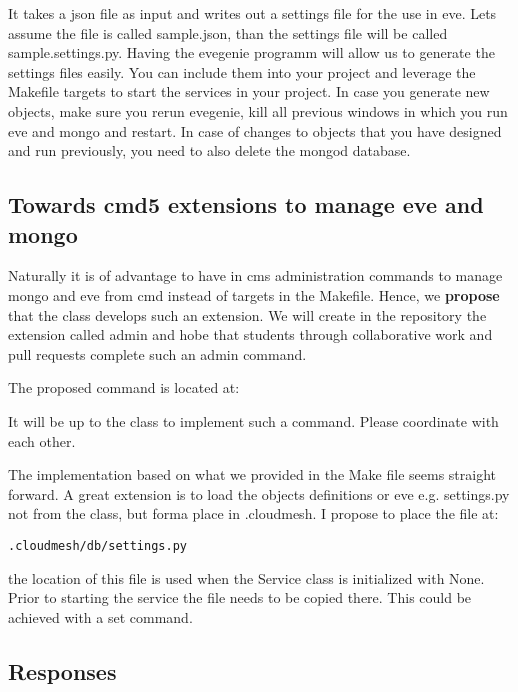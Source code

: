 It takes a json file as input and writes out a settings file for the use
in eve. Lets assume the file is called sample.json, than the settings
file will be called sample.settings.py. Having the evegenie programm
will allow us to generate the settings files easily. You can include
them into your project and leverage the Makefile targets to start the
services in your project. In case you generate new objects, make sure
you rerun evegenie, kill all previous windows in which you run eve and
mongo and restart. In case of changes to objects that you have designed
and run previously, you need to also delete the mongod database.

\subsection{Towards cmd5 extensions to manage eve and
mongo}\label{towards-cmd5-extensions-to-manage-eve-and-mongo}

Naturally it is of advantage to have in cms administration commands to
manage mongo and eve from cmd instead of targets in the Makefile. Hence,
we \textbf{propose} that the class develops such an extension. We will
create in the repository the extension called admin and hobe that
students through collaborative work and pull requests complete such an
admin command.

The proposed command is located at:



It will be up to the class to implement such a command. Please
coordinate with each other.

The implementation based on what we provided in the Make file seems
straight forward. A great extension is to load the objects definitions
or eve e.g. settings.py not from the class, but forma place in
.cloudmesh. I propose to place the file at:

\begin{verbatim}
.cloudmesh/db/settings.py
\end{verbatim}

the location of this file is used when the Service class is initialized
with None. Prior to starting the service the file needs to be copied
there. This could be achieved with a set command.

\subsection{Responses}


